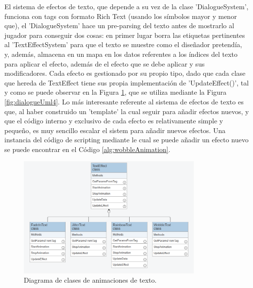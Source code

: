 El sistema de efectos de texto, que depende a su vez de la clase 'DialogueSystem', funciona con tags con formato Rich Text (usando los símbolos mayor y menor que), el 'DialogueSystem' hace un pre-parsing del texto antes de mostrarlo al jugador para conseguir dos cosas:
en primer lugar borra las etiquetas pertinentes al 'TextEffectSystem' para que el texto se muestre como el diseñador pretendía, y, además, almacena en un mapa en los datos referentes a los índices del texto para aplicar 
el efecto, además de el efecto que se debe aplicar y sus modificadores. Cada efecto es gestionado por su propio tipo, dado que cada clase que hereda de TextEffect tiene sus propia implementación de 'UpdateEffect()',
tal y como se puede observar en la Figura \ref{fig:dialogueUml3}, que se utiliza mediante la Figura \ref{fig:dialogueUml4}. Lo más interesante referente al sistema de efectos de texto es que, al haber construido un
'template' la cual seguir para añadir efectos nuevos, y que el código interno y exclusivo de cada efecto es relativamente simple y pequeño, es muy sencillo escalar el sistem para añadir nuevos efectos. Una instancia
 del código de scripting mediante le cual se puede añadir un efecto nuevo se puede encontrar en el Código \ref{alg:wobbleAnimation}.

\begin{figure}[H]
  \centering
    \includegraphics[width=350px,clip=true]{Text_Effects.png}
  \caption{Diagrama de clases de animaciones de texto.}
  \label{fig:dialogueUml3}
\end{figure}



